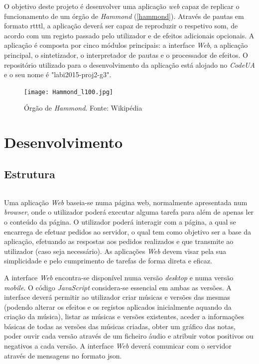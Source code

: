 \documentclass[11pt,openany,twoside]{report}
\begin{document}
O objetivo deste projeto é desenvolver uma aplicação \textit{web} capaz de replicar o funcionamento de um órgão de \textit{Hammond} (\autoref{hammond}). Através de pautas em formato \ac{rtttl}, a aplicação deverá ser capaz de reproduzir o respetivo som, de acordo com um registo passado pelo utilizador e de efeitos adicionais opcionais. A aplicação é composta por cinco módulos principais: a interface \textit{Web}, a aplicação principal, o sintetizador, o interpretador de pautas e o processador de efeitos. O repositório utilizado para o desenvolvimento da aplicação está alojado no \textit{CodeUA} e o seu nome é "labi2015-proj2-g3".

\begin{figure}
 \center
 \texttt{[image: Hammond\_l100.jpg]}
 \caption{Órgão de \textit{Hammond}. Fonte: Wikipédia}
 \label{hammond}
\end{figure}

\part{Desenvolvimento}

\chapter{Estrutura}

\paragraph{ } Uma aplicação \textit{Web} baseia-se numa página web, normalmente apresentada num \textit{browser}, onde o utilizador poderá executar alguma tarefa para além de apenas ler o conteúdo da página. O utilizador poderá interagir com a página, a qual se encarrega de efetuar pedidos ao servidor, o qual tem como objetivo ser a base da aplicação, efetuando as respostas aos pedidos realizados e que transmite ao utilizador (caso seja necessário). As aplicações \textit{Web} devem visar pela sua simplicidade e pelo cumprimento de tarefas de forma direta e eficaz.

A interface \textit{Web} encontra-se disponível numa versão \textit{desktop} e numa versão \textit{mobile}. O código \textit{JavaScript} considera-se essencial em ambas as versões. A interface deverá permitir ao utilizador criar  músicas e versões das mesmas (podendo alterar os efeitos e os registos aplicados inicialmente aquando da criação da música), listar as músicas e versões existentes, aceder a informações básicas de todas as versões das músicas criadas, obter um gráfico das notas, poder ouvir cada versão através de um ficheiro áudio e atribuir votos positivos ou negativos a cada versão. A interface \textit{Web} deverá comunicar com o servidor através de mensagens no formato \ac{json}.
\end{document}

